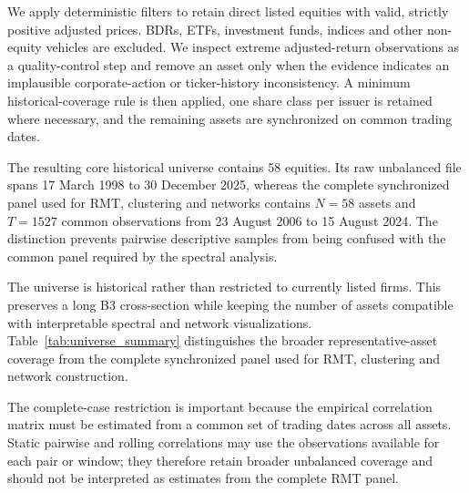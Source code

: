 \label{subsec:asset_filtering}

We apply deterministic filters to retain direct listed equities with valid, strictly positive adjusted prices. BDRs, ETFs, investment funds, indices and other non-equity vehicles are excluded. We inspect extreme adjusted-return observations as a quality-control step and remove an asset only when the evidence indicates an implausible corporate-action or ticker-history inconsistency. A minimum historical-coverage rule is then applied, one share class per issuer is retained where necessary, and the remaining assets are synchronized on common trading dates.

The resulting core historical universe contains 58 equities. Its raw unbalanced file spans 17 March 1998 to 30 December 2025, whereas the complete synchronized panel used for RMT, clustering and networks contains $N=58$ assets and $T=1527$ common observations from 23 August 2006 to 15 August 2024. The distinction prevents pairwise descriptive samples from being confused with the common panel required by the spectral analysis.

The universe is historical rather than restricted to currently listed firms. This preserves a long B3 cross-section while keeping the number of assets compatible with interpretable spectral and network visualizations. Table~\ref{tab:universe_summary} distinguishes the broader representative-asset coverage from the complete synchronized panel used for RMT, clustering and network construction.

\begin{center}
\label{tab:universe_summary}
\end{center}

The complete-case restriction is important because the empirical correlation matrix must be estimated from a common set of trading dates across all assets. Static pairwise and rolling correlations may use the observations available for each pair or window; they therefore retain broader unbalanced coverage and should not be interpreted as estimates from the complete RMT panel.

